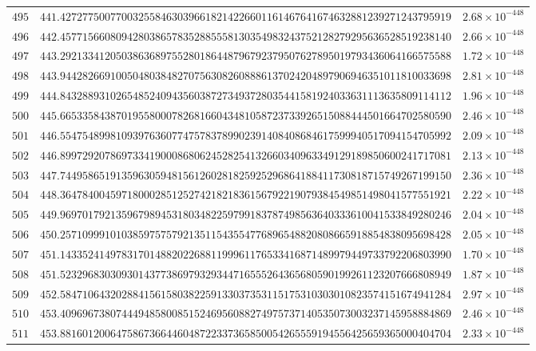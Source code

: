 \documentclass[12pt,reqno]{amsart}
\theoremstyle{remark}
\begin{document}
\begin{longtable}{clc}
$495$ & $441.4272775007700325584630396618214226601161467641674632881239271243795919$ & $2.68\times 10^{-448}$ \\
$496$ & $442.4577156608094280386578352885558130354983243752128279295636528519238140$ & $2.66\times 10^{-448}$ \\
$497$ & $443.2921334120503863689755280186448796792379507627895019793436064166575588$ & $1.72\times 10^{-448}$ \\
$498$ & $443.9442826691005048038482707563082608886137024204897906946351011810033698$ & $2.81\times 10^{-448}$ \\
$499$ & $444.8432889310265485240943560387273493728035441581924033631113635809114112$ & $1.96\times 10^{-448}$ \\
$500$ & $445.6653358438701955800078268166043481058723733926515088444501664702580590$ & $2.46\times 10^{-448}$ \\
$501$ & $446.5547548998109397636077475783789902391408408684617599940517094154705992$ & $2.09\times 10^{-448}$ \\
$502$ & $446.8997292078697334190008680624528254132660340963349129189850600241717081$ & $2.13\times 10^{-448}$ \\
$503$ & $447.7449586519135963059481561260281825925296864188411730818715749267199150$ & $2.36\times 10^{-448}$ \\
$504$ & $448.3647840045971800028512527421821836156792219079384549851498041577551921$ & $2.22\times 10^{-448}$ \\
$505$ & $449.9697017921359679894531803482259799183787498563640333610041533849280246$ & $2.04\times 10^{-448}$ \\
$506$ & $450.2571099910103859757579213511543554776896548820808665918854838095698428$ & $2.05\times 10^{-448}$ \\
$507$ & $451.1433524149783170148820226881199961176533416871489979449733792206803990$ & $1.70\times 10^{-448}$ \\
$508$ & $451.5232968303093014377386979329344716555264365680590199261123207666808949$ & $1.87\times 10^{-448}$ \\
$509$ & $452.5847106432028841561580382259133037353115175310303010823574151674941284$ & $2.97\times 10^{-448}$ \\
$510$ & $453.4096967380744494858008515246956088274975737140535073003237145958884869$ & $2.46\times 10^{-448}$ \\
$511$ & $453.8816012006475867366446048722337365850054265559194556425659365000404704$ & $2.33\times 10^{-448}$ \\

\end{longtable}
\end{document}
